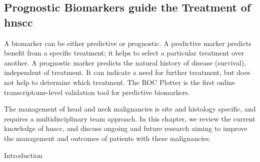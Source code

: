 \documentclass[12pt, a4paper]{article}
\begin{document}
\subsection{Prognostic Biomarkers guide the Treatment of \acrshort{hnscc}}
A biomarker can be either predictive or prognostic. A predictive marker predicts benefit from a specific treatment; it helps to select a particular treatment over another. A prognostic marker predicts the natural history of disease (survival), independent of treatment. It can indicate a need for further treatment, but does not help to determine which treatment. 
The ROC Plotter is the first online transcriptome-level validation tool for predictive biomarkers.

The management of head and neck malignancies is site and histology specific, and requires a multidisciplinary team approach. In this chapter, we review the current knowledge of \acrshort{hnscc}, and discuss ongoing and future research aiming to improve the management and outcomes of patients with these malignancies.


Introduction
\end{document}
